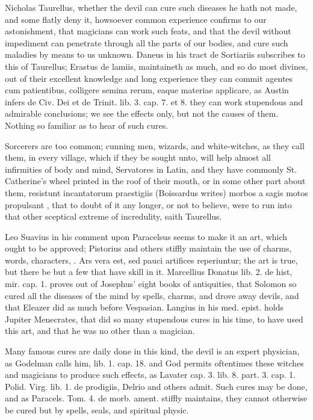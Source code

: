{Nicholas Taurellus, whether the devil can cure such diseases he hath
not made, and some flatly deny it, howsoever common experience confirms
to our astonishment, that magicians can work such feats, and that the
devil without impediment can penetrate through all the parts of our
bodies, and cure such maladies by means to us unknown. Daneus in his
tract de Sortiariis subscribes to this of Taurellus; Erastus de lamiis,
maintaineth as much, and so do most divines, out of their excellent
knowledge and long experience they can commit agentes cum
patientibus, colligere semina rerum, eaque materiae applicare, as
Austin infers de Civ. Dei et de Trinit. lib. 3. cap. 7. et 8. they can
work stupendous and admirable conclusions; we see the effects only, but
not the causes of them. Nothing so familiar as to hear of such cures.

Sorcerers are too common; cunning men, wizards, and white-witches, as
they call them, in every village, which if they be sought unto, will
help almost all infirmities of body and mind, Servatores in Latin, and
they have commonly St. Catherine's wheel printed in the roof of their
mouth, or in some other part about them, resistunt incantatorum
praestigiis (Boissardus writes) morbos a sagis motos propulsant
\etc{}, that to doubt of it any longer, or not to believe, were to
run into that other sceptical extreme of incredulity, saith Taurellus.

Leo Suavius in his comment upon Paracelsus seems to make it an art,
which ought to be approved; Pistorius and others stiffly maintain the
use of charms, words, characters, \etc{}. Ars vera est, sed pauci artifices
reperiuntur; the art is true, but there be but a few that have skill in
it. Marcellius Donatus lib. 2. de hist, mir. cap. 1. proves out of
Josephus' eight books of antiquities, that Solomon so cured all
the diseases of the mind by spells, charms, and drove away devils, and
that Eleazer did as much before Vespasian. Langius in his med. epist.
holds Jupiter Menecrates, that did so many stupendous cures in his
time, to have used this art, and that he was no other than a magician.

Many famous cures are daily done in this kind, the devil is an expert
physician, as Godelman calls him, lib. 1. cap. 18. and God permits
oftentimes these witches and magicians to produce such effects, as
Lavater cap. 3. lib. 8. part. 3. cap. 1. Polid. Virg. lib. 1. de
prodigiis, Delrio and others admit. Such cures may be done, and as
Paracels. Tom. 4. de morb. ament. stiffly maintains, they cannot
otherwise be cured but by spells, seals, and spiritual physic.

}
